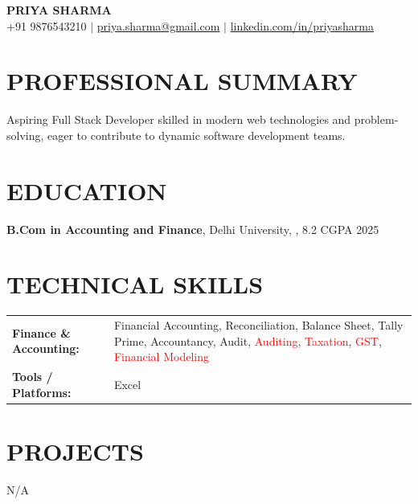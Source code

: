 \documentclass[9.5pt,a4paper]{extarticle}
\begin{document}
\begin{center}
{\Large \textbf{PRIYA SHARMA}} \\ \vspace{2pt}
+91 9876543210 \quad $|$ \quad \href{mailto:priya.sharma@gmail.com}{priya.sharma@gmail.com} \quad $|$ \quad \href{https://linkedin.com/in/priyasharma}{linkedin.com/in/priyasharma}
\end{center}

\section*{PROFESSIONAL SUMMARY}
Aspiring Full Stack Developer skilled in modern web technologies and problem-solving, eager to contribute to dynamic software development teams.

\section*{EDUCATION}
\noindent \textbf{B.Com in Accounting and Finance}, Delhi University, , 8.2 CGPA \hfill 2025 \\ \vspace{4pt}


\section*{TECHNICAL SKILLS}
\begin{tabular}{@{}p{2.3in}p{4.6in}@{}}
\textbf{Finance \& Accounting:} & Financial Accounting, Reconciliation, Balance Sheet, Tally Prime, Accountancy, Audit, \textcolor{red}{Auditing}, \textcolor{red}{Taxation}, \textcolor{red}{GST}, \textcolor{red}{Financial Modeling} \\
\textbf{Tools / Platforms:} & Excel \\
\end{tabular}



\section*{PROJECTS}
N/A


\end{document}
